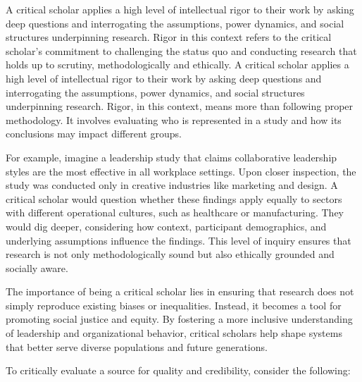 \documentclass[
  letterpaper,
  DIV=11,
  numbers=noendperiod]{scrreprt}
\begin{document}
A critical scholar applies a high level of intellectual rigor to their
work by asking deep questions and interrogating the assumptions, power
dynamics, and social structures underpinning research. Rigor in this
context refers to the critical scholar's commitment to challenging the
status quo and conducting research that holds up to scrutiny,
methodologically and ethically. A critical scholar applies a high level
of intellectual rigor to their work by asking deep questions and
interrogating the assumptions, power dynamics, and social structures
underpinning research. Rigor, in this context, means more than following
proper methodology. It involves evaluating who is represented in a study
and how its conclusions may impact different groups.

For example, imagine a leadership study that claims collaborative
leadership styles are the most effective in all workplace settings. Upon
closer inspection, the study was conducted only in creative industries
like marketing and design. A critical scholar would question whether
these findings apply equally to sectors with different operational
cultures, such as healthcare or manufacturing. They would dig deeper,
considering how context, participant demographics, and underlying
assumptions influence the findings. This level of inquiry ensures that
research is not only methodologically sound but also ethically grounded
and socially aware.

The importance of being a critical scholar lies in ensuring that
research does not simply reproduce existing biases or inequalities.
Instead, it becomes a tool for promoting social justice and equity. By
fostering a more inclusive understanding of leadership and
organizational behavior, critical scholars help shape systems that
better serve diverse populations and future generations.

To critically evaluate a source for quality and credibility, consider
the following:
\end{document}
